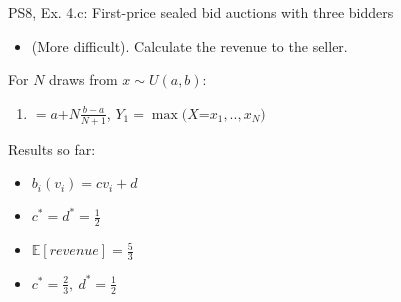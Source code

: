 \begin{frame}{PS8, Ex. 4.c: First-price sealed bid auctions with three bidders}
    \begin{itemize}
      \item[(c)] (More difficult). Calculate the revenue to the seller.
    \end{itemize}
    \vspace{-8pt}
    \begin{multicols}{2}
      \vfill\null\columnbreak
      For $N$ draws from $x\sim U(a, b):$
      \vspace{-6pt}
      \begin{enumerate}
        \item[$\mathbb{E}(Y_1)$] $=a$+$N\frac{b-a}{N+1}$, $Y_1=\max(X$=$x_1,..,x_N)$
      \end{enumerate}
      \vspace{-6pt}
      Results so far:
      \vspace{-6pt}
      \begin{itemize}
        \item[($*$)] $b_i(v_i) = cv_i+d$
        \item[(3.a)] $c^*=d^*=\frac{1}{2}$
        \item[(3.b)] $\mathbb{E}[revenue]=\frac{5}{3}$
        \item[(4.a)] $c^*=\frac{2}{3},\ d^*=\frac{1}{2}$
      \end{itemize}
      \vfill\null
    \end{multicols}
    \vfill\null
\end{frame}
